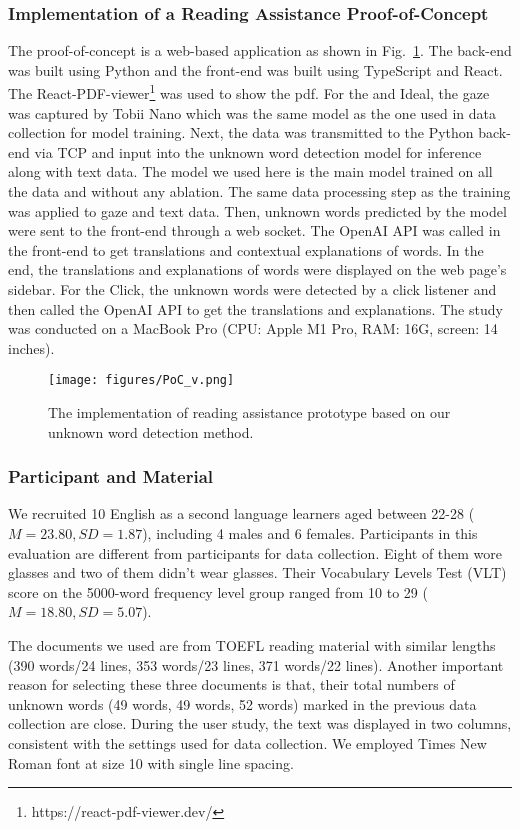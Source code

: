 \subsubsection{Implementation of a Reading Assistance Proof-of-Concept}
The proof-of-concept is a web-based application as shown in Fig.~\ref{fig:PoC}. The back-end was built using Python and the front-end was built using TypeScript and React. The React-PDF-viewer\footnote{https://react-pdf-viewer.dev/} was used to show the pdf. For the \name{} and Ideal, the gaze was captured by Tobii Nano which was the same model as the one used in data collection for model training. Next, the data was transmitted to the Python back-end via TCP and input into the unknown word detection model for inference along with text data. The model we used here is the main model trained on all the data and without any ablation. The same data processing step as the training was applied to gaze and text data. Then, unknown words predicted by the model were sent to the front-end through a web socket. The OpenAI API was called in the front-end to get translations and contextual explanations of words. In the end, the translations and explanations of words were displayed on the web page's sidebar. For the Click, the unknown words were detected by a click listener and then called the OpenAI API to get the translations and explanations. The study was conducted on a MacBook Pro (CPU: Apple M1 Pro, RAM: 16G, screen: 14 inches).

\begin{figure}
  \centering
  \texttt{[image: figures/PoC\_v.png]}
  \caption{The implementation of reading assistance prototype based on our unknown word detection method.}
  \label{fig:PoC} 
\end{figure}

\subsubsection{Participant and Material}
\label{sec:eval_participant}
We recruited 10 English as a second language learners aged between 22-28 ($M=23.80, SD=1.87$), including 4 males and 6 females. Participants in this evaluation are different from participants for data collection. Eight of them wore glasses and two of them didn't wear glasses. Their Vocabulary Levels Test (VLT) score on the 5000-word frequency level group ranged from 10 to 29 ($M=18.80, SD=5.07$).

The documents we used are from TOEFL reading material with similar lengths (390 words/24 lines, 353 words/23 lines, 371 words/22 lines). Another important reason for selecting these three documents is that, their total numbers of unknown words (49 words, 49 words, 52 words) marked in the previous data collection are close. During the user study, the text was displayed in two columns, consistent with the settings used for data collection. We employed Times New Roman font at size 10 with single line spacing.

